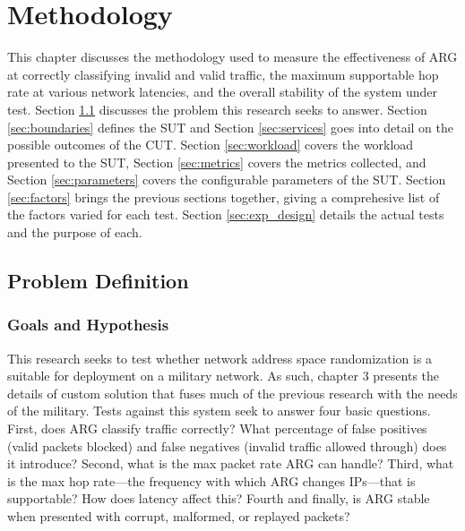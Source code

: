 \chapter{Methodology}
\label{chp:methodology}

\par This chapter discusses the methodology used to measure the effectiveness of \ac{ARG} at correctly classifying invalid and valid traffic, the maximum supportable hop rate at various network latencies, and the overall stability of the system under test. Section \ref{sec:problem_def} discusses the problem this research seeks to answer. Section \ref{sec:boundaries} defines the \ac{SUT} and Section \ref{sec:services} goes into detail on the possible outcomes of the \ac{CUT}. Section \ref{sec:workload} covers the workload presented to the \ac{SUT}, Section \ref{sec:metrics} covers the metrics collected, and Section \ref{sec:parameters} covers the configurable parameters of the \ac{SUT}. Section \ref{sec:factors} brings the previous sections together, giving a comprehesive list of the factors varied for each test. Section \ref{sec:exp_design} details the actual tests and the purpose of each.

\section{Problem Definition}
\label{sec:problem_def}
\subsection{Goals and Hypothesis}
\label{sec:goals}
\par This research seeks to test whether network address space randomization is a suitable for deployment on a military network. As such, chapter 3 presents the details of custom solution that fuses much of the previous research with the needs of the military. Tests against this system seek to answer four basic questions.  First, does \ac{ARG} classify traffic correctly? What percentage of false positives (valid packets blocked) and false negatives (invalid traffic allowed through) does it introduce? Second, what is the max packet rate \ac{ARG} can handle? Third, what is the max hop rate---the frequency with which \ac{ARG} changes \acp{IP}---that is supportable? How does latency affect this? Fourth and finally, is \ac{ARG} stable when presented with corrupt, malformed, or replayed packets?


